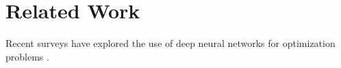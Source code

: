 
\chapter{Related Work}

Recent surveys have explored the use of deep neural networks for optimization problems \cite{wangSolvingCombinatorialOptimization2024}.